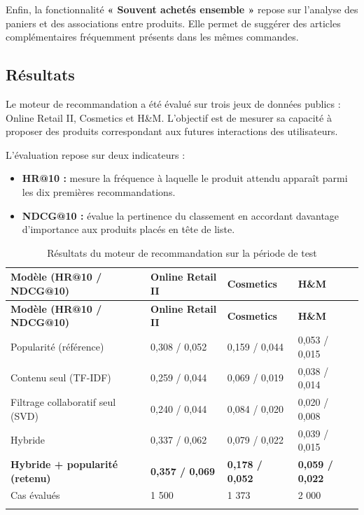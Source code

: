 Enfin, la fonctionnalité \textbf{« Souvent achetés ensemble »} repose sur l'analyse des paniers et des associations entre produits. Elle permet de suggérer des articles complémentaires fréquemment présents dans les mêmes commandes.






\subsection{Résultats}

Le moteur de recommandation a été évalué sur trois jeux de données publics : Online Retail II, Cosmetics et H\&M. L'objectif est de mesurer sa capacité à proposer des produits correspondant aux futures interactions des utilisateurs.

L'évaluation repose sur deux indicateurs :
\begin{itemize}
    \item \textbf{HR@10 :} mesure la fréquence à laquelle le produit attendu apparaît parmi les dix premières recommandations.
    \item \textbf{NDCG@10 :} évalue la pertinence du classement en accordant davantage d'importance aux produits placés en tête de liste.
\end{itemize}

\renewcommand{\arraystretch}{1.3}
\begin{longtable}{|p{5.2cm}|p{2.9cm}|p{2.9cm}|p{2.9cm}|}
\hline
\textbf{Modèle (HR@10 / NDCG@10)} & \textbf{Online Retail II} & \textbf{Cosmetics} & \textbf{H\&M} \\
\hline
\endfirsthead
\hline
\textbf{Modèle (HR@10 / NDCG@10)} & \textbf{Online Retail II} & \textbf{Cosmetics} & \textbf{H\&M} \\
\hline
\endhead
Popularité (référence) & 0,308 / 0,052 & 0,159 / 0,044 & 0,053 / 0,015 \\
\hline
Contenu seul (TF-IDF) & 0,259 / 0,044 & 0,069 / 0,019 & 0,038 / 0,014 \\
\hline
Filtrage collaboratif seul (SVD) & 0,240 / 0,044 & 0,084 / 0,020 & 0,020 / 0,008 \\
\hline
Hybride & 0,337 / 0,062 & 0,079 / 0,022 & 0,039 / 0,015 \\
\hline
\textbf{Hybride + popularité (retenu)} & \textbf{0,357 / 0,069} & \textbf{0,178 / 0,052} & \textbf{0,059 / 0,022} \\
\hline
Cas évalués & 1 500 & 1 373 & 2 000 \\
\hline
\caption{Résultats du moteur de recommandation sur la période de test}
\label{tab:resultats-reco}
\end{longtable}


